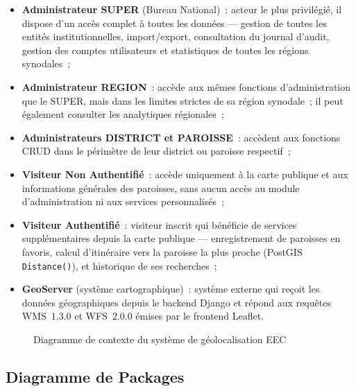 \documentclass[12pt, a4paper]{report}
\begin{document}
\begin{itemize}[itemsep=3pt, topsep=5pt, leftmargin=1.5cm]
  \item \textbf{Administrateur SUPER} (Bureau National)~: acteur le plus
    privilégié, il dispose d'un accès complet à toutes les données --- gestion
    de toutes les entités institutionnelles, import/export, consultation du
    journal d'audit, gestion des comptes utilisateurs et statistiques de
    toutes les régions synodales~;
  \item \textbf{Administrateur REGION}~: accède aux mêmes fonctions
    d'administration que le SUPER, mais dans les limites strictes de sa
    région synodale~; il peut également consulter les analytiques régionales~;
  \item \textbf{Administrateurs DISTRICT et PAROISSE}~: accèdent aux fonctions
    CRUD dans le périmètre de leur district ou paroisse respectif~;
  \item \textbf{Visiteur Non Authentifié}~: accède uniquement à la carte
    publique et aux informations générales des paroisses, sans aucun accès
    au module d'administration ni aux services personnalisés~;
  \item \textbf{Visiteur Authentifié}~: visiteur inscrit qui bénéficie de
    services supplémentaires depuis la carte publique --- enregistrement de
    paroisses en favoris, calcul d'itinéraire vers la paroisse la plus proche
    (PostGIS \texttt{Distance()}), et historique de ses recherches~;
  \item \textbf{GeoServer} (système cartographique)~: système externe qui reçoit
    les données géographiques depuis le backend Django et répond aux requêtes
    WMS~1.3.0 et WFS~2.0.0 émises par le frontend Leaflet.
\end{itemize}

\begin{figure}[H]
  \centering
  \caption{Diagramme de contexte du système de géolocalisation EEC}
  \label{fig:diag-contexte}
\end{figure}

\subsection{Diagramme de Packages}
\label{ssec:packages}
\end{document}

